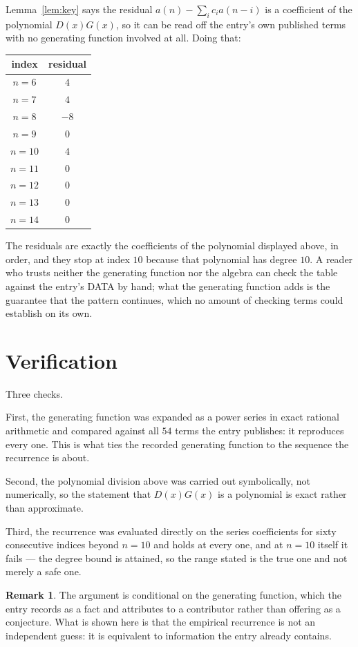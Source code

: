 \documentclass[11pt,a4paper]{article}
\theoremstyle{plain}
\theoremstyle{definition}
\newtheorem{remark}[theorem]{Remark}
\begin{document}
Lemma~\ref{lem:key} says the residual $a(n)-\sum_ic_ia(n-i)$ is a coefficient of the
polynomial $D(x)G(x)$, so it can be read off the entry's own published terms with no
generating function involved at all. Doing that:
\begin{center}
\begin{tabular}{cc}
index & residual \\ \hline
$n=6$ & $4$ \\
$n=7$ & $4$ \\
$n=8$ & $-8$ \\
$n=9$ & $0$ \\
$n=10$ & $4$ \\
$n=11$ & $0$ \\
$n=12$ & $0$ \\
$n=13$ & $0$ \\
$n=14$ & $0$
\end{tabular}
\end{center}
The residuals are exactly the coefficients of the polynomial displayed above, in order, and
they stop at index $10$ because that polynomial has degree $10$. A reader who trusts
neither the generating function nor the algebra can check the table against the entry's DATA
by hand; what the generating function adds is the guarantee that the pattern continues, which
no amount of checking terms could establish on its own.

\section{Verification}

Three checks.

First, the generating function was expanded as a power series in exact rational arithmetic and
compared against all $54$ terms the entry publishes: it reproduces every one. This is
what ties the recorded generating function to the sequence the recurrence is about.

Second, the polynomial division above was carried out symbolically, not numerically, so the
statement that $D(x)G(x)$ is a polynomial is exact rather than approximate.

Third, the recurrence was evaluated directly on the series coefficients for sixty consecutive
indices beyond $n=10$ and holds at every one, and at $n=10$ itself it fails --- the
degree bound is attained, so the range stated is the true one and not merely a safe one.

\begin{remark}
The argument is conditional on the generating function, which the entry records as a fact and
attributes to a contributor rather than offering as a conjecture. What is shown here is that
the empirical recurrence is not an independent guess: it is equivalent to information the
entry already contains.
\end{remark}
\end{document}
